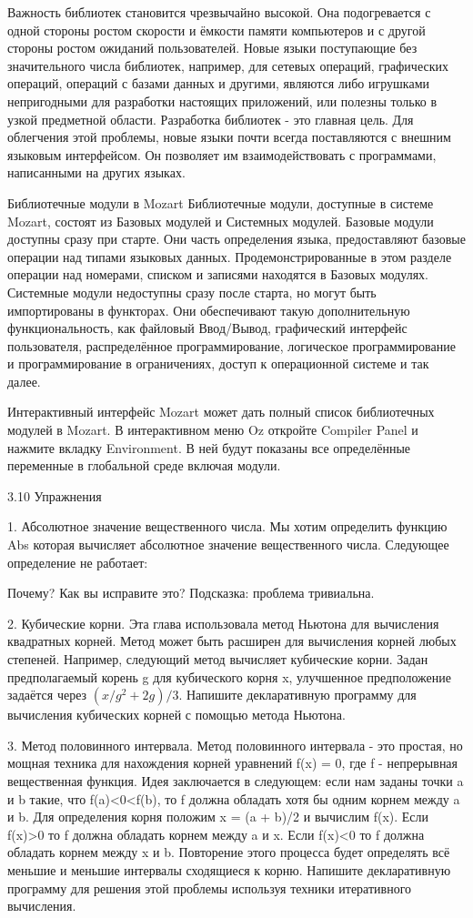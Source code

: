 Важность библиотек становится чрезвычайно высокой. Она подогревается с одной стороны ростом скорости и ёмкости памяти компьютеров и с другой стороны ростом ожиданий пользователей. Новые языки поступающие без значительного числа библиотек, например, для сетевых операций, графических операций, операций с базами данных и другими, являются либо игрушками непригодными для разработки настоящих приложений, или полезны только в узкой предметной области. Разработка библиотек - это главная цель. Для облегчения этой проблемы, новые языки почти всегда поставляются с внешним языковым интерфейсом. Он позволяет им взаимодействовать с программами, написанными на других языках.

Библиотечные модули в Mozart Библиотечные модули, доступные в системе Mozart, состоят из Базовых модулей и Системных модулей. Базовые модули доступны сразу при старте. Они часть определения языка, предоставляют базовые операции над типами языковых данных. Продемонстрированные в этом разделе операции над номерами, списком и записями находятся в Базовых модулях. Системные модули недоступны сразу после старта, но могут быть импортированы в функторах. Они обеспечивают такую дополнительную функциональность, как файловый Ввод/Вывод, графический интерфейс пользователя, распределённое программирование, логическое программирование и программирование в ограничениях, доступ к операционной системе и так далее.

Интерактивный интерфейс Mozart может дать полный список библиотечных модулей в Mozart. В интерактивном меню Oz откройте Compiler Panel и нажмите вкладку Environment. В ней будут показаны все определённые переменные в глобальной среде включая модули.

3.10 Упражнения

1. Абсолютное значение вещественного числа. Мы хотим определить функцию Abs которая вычисляет абсолютное значение вещественного числа. Следующее определение не работает:

Почему? Как вы исправите это? Подсказка: проблема тривиальна.

2. Кубические корни. Эта глава использовала метод Ньютона для вычисления квадратных корней. Метод может быть расширен для вычисления корней любых степеней. Например, следующий метод вычисляет кубические корни. Задан предполагаемый корень g для кубического корня x, улучшенное предположение задаётся через $(x/g^2 + 2g)/3$. Напишите декларативную программу для вычисления кубических корней с помощью метода Ньютона.

3. Метод половинного интервала. Метод половинного интервала - это простая, но мощная техника для нахождения корней уравнений f(x) = 0, где f - непрерывная вещественная функция. Идея заключается в следующем: если нам заданы точки a и b такие, что f(a)<0<f(b), то f должна обладать хотя бы одним корнем между a и b. Для определения корня положим x = (a + b)/2 и вычислим f(x). Если f(x)>0 то f должна обладать корнем между a и x. Если f(x)<0 то f должна обладать корнем между x и b. Повторение этого процесса будет определять всё меньшие и меньшие интервалы сходящиеся к корню. Напишите декларативную программу для решения этой проблемы используя техники итеративного вычисления.

